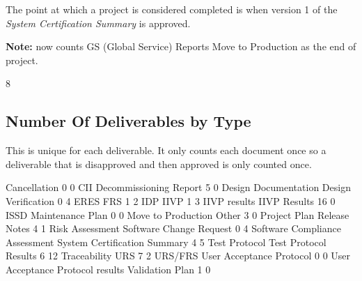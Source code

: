 \documentclass{article}
\begin{document}
The point at which a project is considered completed is when version 1 of the
\textit{System Certification Summary} is approved.

\textbf{Note:} now counts GS (Global Service) Reports Move to Production as the end
of project.

\begin{Schunk}
\begin{Soutput}
[1] 8
\end{Soutput}
\end{Schunk}


\subsection{Number Of Deliverables by Type}
This is unique for each deliverable. It only counts each document once so a deliverable
that is disapproved and then approved is only counted once.

\begin{Schunk}
\begin{Soutput}
                                                     Cancellation 
                               0                                0 
                             CII           Decommissioning Report 
                               5                                0 
            Design Documentation              Design Verification 
                               0                                4 
                            ERES                              FRS 
                               1                                2 
                             IDP                             IIVP 
                               1                                3 
                    IIVP results                     IIVP Results 
                              16                                0 
                            ISSD                 Maintenance Plan 
                               0                                0 
              Move to Production                            Other 
                               3                                0 
                    Project Plan                    Release Notes 
                               4                                1 
                 Risk Assessment          Software Change Request 
                               0                                4 
  Software Compliance Assessment     System Certification Summary 
                               4                                5 
                   Test Protocol            Test Protocol Results 
                               6                               12 
                    Traceability                              URS 
                               7                                2 
                         URS/FRS         User Acceptance Protocol 
                               0                                0 
User Acceptance Protocol results                  Validation Plan 
                               1                                0 
\end{Soutput}
\end{Schunk}
\end{document}
